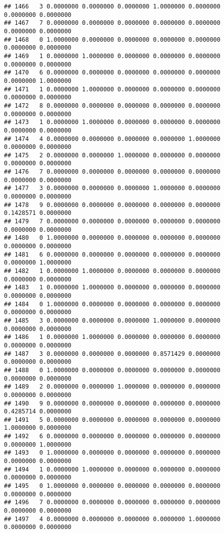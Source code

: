 \documentclass[
]{article}
\begin{document}
\begin{verbatim}
## 1466   3 0.0000000 0.0000000 0.0000000 1.0000000 0.0000000 0.0000000 0.0000000
## 1467   7 0.0000000 0.0000000 0.0000000 0.0000000 0.0000000 0.0000000 0.0000000
## 1468   0 1.0000000 0.0000000 0.0000000 0.0000000 0.0000000 0.0000000 0.0000000
## 1469   1 0.0000000 1.0000000 0.0000000 0.0000000 0.0000000 0.0000000 0.0000000
## 1470   6 0.0000000 0.0000000 0.0000000 0.0000000 0.0000000 0.0000000 1.0000000
## 1471   1 0.0000000 1.0000000 0.0000000 0.0000000 0.0000000 0.0000000 0.0000000
## 1472   8 0.0000000 0.0000000 0.0000000 0.0000000 0.0000000 0.0000000 0.0000000
## 1473   1 0.0000000 1.0000000 0.0000000 0.0000000 0.0000000 0.0000000 0.0000000
## 1474   4 0.0000000 0.0000000 0.0000000 0.0000000 1.0000000 0.0000000 0.0000000
## 1475   2 0.0000000 0.0000000 1.0000000 0.0000000 0.0000000 0.0000000 0.0000000
## 1476   7 0.0000000 0.0000000 0.0000000 0.0000000 0.0000000 0.0000000 0.0000000
## 1477   3 0.0000000 0.0000000 0.0000000 1.0000000 0.0000000 0.0000000 0.0000000
## 1478   9 0.0000000 0.0000000 0.0000000 0.0000000 0.0000000 0.1428571 0.0000000
## 1479   7 0.0000000 0.0000000 0.0000000 0.0000000 0.0000000 0.0000000 0.0000000
## 1480   0 1.0000000 0.0000000 0.0000000 0.0000000 0.0000000 0.0000000 0.0000000
## 1481   6 0.0000000 0.0000000 0.0000000 0.0000000 0.0000000 0.0000000 1.0000000
## 1482   1 0.0000000 1.0000000 0.0000000 0.0000000 0.0000000 0.0000000 0.0000000
## 1483   1 0.0000000 1.0000000 0.0000000 0.0000000 0.0000000 0.0000000 0.0000000
## 1484   0 1.0000000 0.0000000 0.0000000 0.0000000 0.0000000 0.0000000 0.0000000
## 1485   3 0.0000000 0.0000000 0.0000000 1.0000000 0.0000000 0.0000000 0.0000000
## 1486   1 0.0000000 1.0000000 0.0000000 0.0000000 0.0000000 0.0000000 0.0000000
## 1487   3 0.0000000 0.0000000 0.0000000 0.8571429 0.0000000 0.0000000 0.0000000
## 1488   0 1.0000000 0.0000000 0.0000000 0.0000000 0.0000000 0.0000000 0.0000000
## 1489   2 0.0000000 0.0000000 1.0000000 0.0000000 0.0000000 0.0000000 0.0000000
## 1490   9 0.0000000 0.0000000 0.0000000 0.0000000 0.0000000 0.4285714 0.0000000
## 1491   5 0.0000000 0.0000000 0.0000000 0.0000000 0.0000000 1.0000000 0.0000000
## 1492   6 0.0000000 0.0000000 0.0000000 0.0000000 0.0000000 0.0000000 1.0000000
## 1493   0 1.0000000 0.0000000 0.0000000 0.0000000 0.0000000 0.0000000 0.0000000
## 1494   1 0.0000000 1.0000000 0.0000000 0.0000000 0.0000000 0.0000000 0.0000000
## 1495   0 1.0000000 0.0000000 0.0000000 0.0000000 0.0000000 0.0000000 0.0000000
## 1496   7 0.0000000 0.0000000 0.0000000 0.0000000 0.0000000 0.0000000 0.0000000
## 1497   4 0.0000000 0.0000000 0.0000000 0.0000000 1.0000000 0.0000000 0.0000000

\end{verbatim}
\end{document}
